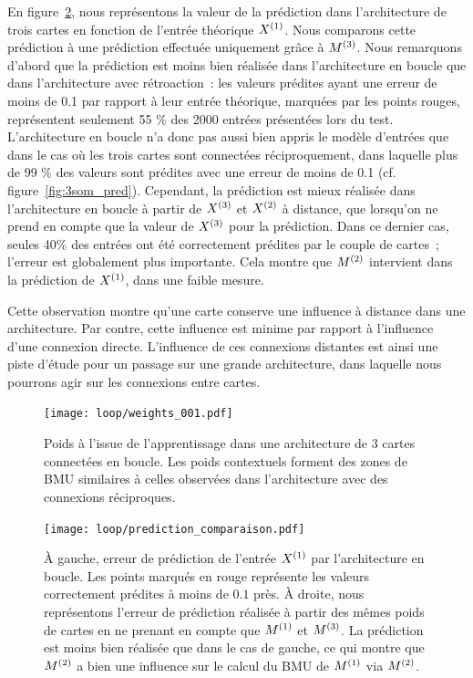 \documentclass[../main]{subfiles}
\begin{document}
En figure~\ref{fig:pred_loop}, nous représentons la valeur de la prédiction dans l'architecture de trois cartes en fonction de l'entrée théorique $X^{({1})}$. Nous comparons cette prédiction à une prédiction effectuée uniquement grâce à $M^{({3})}$.
Nous remarquons d'abord que la prédiction est moins bien réalisée dans l'architecture en boucle que dans l'architecture avec rétroaction~: les valeurs prédites ayant une erreur de moins de 0.1 par rapport à leur entrée théorique, marquées par les points rouges, représentent seulement 55 \% des 2000 entrées présentées lors du test.
L'architecture en boucle n'a donc pas aussi bien appris le modèle d'entrées que dans le cas où les trois cartes sont connectées réciproquement, dans laquelle plus de 99 \% des valeurs sont prédites avec une erreur de moins de 0.1 (cf. figure~\ref{fig:3som_pred}).
Cependant, la prédiction est mieux réalisée dans l'architecture en boucle à partir de $X^{({3})}$ et $X^{({2})}$ à distance, que lorsqu'on ne prend en compte que la valeur de $X^{({3})}$ pour la prédiction. 
Dans ce dernier cas, seules 40\% des entrées ont été correctement prédites par le couple de cartes~; l'erreur est globalement plus importante.
Cela montre que $M^{({2})}$ intervient dans la prédiction de $X^{({1})}$, dans une faible mesure.

Cette observation montre qu'une carte conserve une influence à distance dans une architecture. 
Par contre, cette influence est minime par rapport à l'influence d'une connexion directe.
L'influence de ces connexions distantes est ainsi une piste d'étude pour un passage sur une grande architecture, dans laquelle nous pourrons agir sur les connexions entre cartes.

\begin{figure}[h!]
		\centering\texttt{[image: loop/weights\_001.pdf]}
		\caption{Poids à l'issue de l'apprentissage dans une architecture de 3 cartes connectées en boucle. Les poids contextuels forment des zones de BMU similaires à celles observées dans l'architecture avec des connexions réciproques.\label{fig:3som_loop}}
\end{figure}

\begin{figure}[h!]
	\centering\texttt{[image: loop/prediction\_comparaison.pdf]}
	\caption{\`A gauche, erreur de prédiction de l'entrée $X^{({1})}$ par l'architecture en boucle. Les points marqués en rouge représente les valeurs correctement prédites à moins de $0.1$ près. 
	\`A droite, nous représentons l'erreur de prédiction réalisée à partir des mêmes poids de cartes en ne prenant en compte que $M^{({1})}$ et $M^{({3})}$. La prédiction est moins bien réalisée que dans le cas de gauche, ce qui montre que $M^{({2})}$ a bien une influence sur le calcul du BMU de $M^{({1})}$ via $M^{({2})}$.
	\label{fig:pred_loop}}
\end{figure}
\end{document}
